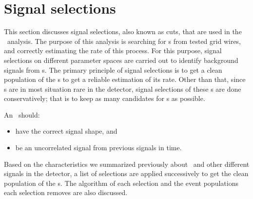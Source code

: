 \section{Signal selections}
\label{sec:cuts}
This section discusses signal selections, also known as cuts, that are used in the \gtest\ analysis. The purpose of this analysis is searching for \ees s from tested grid wires, and correctly estimating the rate of this process. For this purpose,  signal selections on different parameter spaces are carried out to identify background signals from \ees s.  The primary principle of signal selections is to get a clean population of the \ees s to get a reliable estimation of its rate. Other than that, since \ees s are in most situation rare in the detector, signal selections of these \ees s are done conservatively; that is to keep as many candidates for \ees s as possible. 

An \ees\ should: 
\begin{itemize}
\item have the correct signal shape, and
\item be an uncorrelated signal from previous signals in time.
\end{itemize}

Based on the characteristics we summarized previously about \ees\ and other different signals in the detector, a list of selections are applied successively to get the clean population of the \ees s. The algorithm of each selection and the event populations each selection removes are also discussed.     

